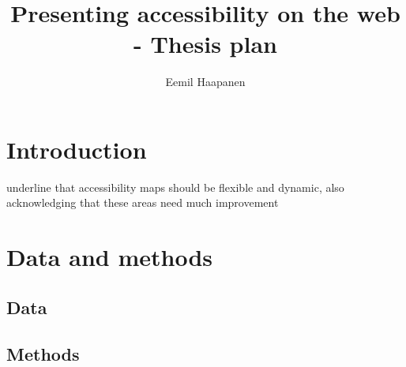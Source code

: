 \documentclass{article}
\title{Presenting accessibility on the web - Thesis plan}
\author{Eemil Haapanen}
\begin{document}
\maketitle

\section{Introduction}
\textcite{but2018} underline that accessibility maps should be flexible and dynamic,
also acknowledging that these areas need much improvement


\section{Data and methods}

\subsection{Data}
\subsection{Methods}

\printbibliography
\end{document}
